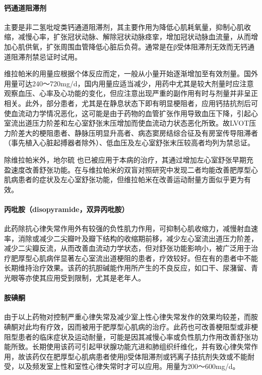 \paragraph{钙通道阻滞剂}

主要是非二氢吡啶类钙通道阻滞剂，其主要作用为降低心肌耗氧量，抑制心肌收缩，减慢心率，扩张冠状动脉、解除冠状动脉痉挛，增加冠状动脉血流量，从而增加心肌供氧，扩张周围血管降低心脏后负荷。通常是在β受体阻滞剂无效而无钙通道阻滞剂禁忌证时试用。

维拉帕米的用量应根据个体反应而定，一般从小量开始逐渐增加至有效剂量。国外用量可达240～720mg/d，国内用量应适当减少，用药中尤其是较大剂量时应注意观察血压、心率及心功能的变化，但应注意出现严重的副作用有时与剂量并非呈正相关。此外，部分患者，尤其是在静息状态下即有明显梗阻者，应用钙拮抗剂后可使血流动力学情况恶化，这可能是由于药物的血管扩张作用导致血压下降，引起心室流出道压力阶差和左心室舒张末压增加而使血流动力状态恶化所致。故LVOT压力阶差大的梗阻患者、静脉压明显升高者、病态窦房结综合征及有房室传导阻滞者（事先植入心脏起搏器者除外）、低血压及左心室舒张末压较高者均列为禁忌证。

除维拉帕米外，地尔硫{}
也已被应用于本病的治疗，其通过增加左心室舒张早期充盈速度改善舒张功能。在与维拉帕米的双盲对照研究中发现二者均能改善肥厚型心肌病患者的症状及左心室舒张功能，但维拉帕米在改善运动耐量方面似乎更为有效。

\paragraph{丙吡胺（disopyramide，双异丙吡胺）}

此药除抗心律失常作用外有较强的负性肌力作用，可抑制心肌收缩力，减慢射血速率，消除或减少二尖瓣叶及瓣下结构的收缩期前移，减少左心室流出道压力阶差，减少二尖瓣反流，从而改善血流动力学状态，但对舒张功能影响小，被广泛用于治疗肥厚型心肌病伴显著左心室流出道梗阻的患者，疗效较好。但在有的患者中不能长期维持治疗效果。该药的抗胆碱能作用所产生的不良反应，如口干、尿潴留、青光眼等亦使其应用受到限制，尤其是老年人。

\paragraph{胺碘酮}

由于以上药物对控制严重心律失常及减少室上性心律失常发作的效果均较差，而胺碘酮对此均有疗效，因而被用于肥厚型心肌病的治疗。此药也可改善梗阻型或非梗阻型患者的临床症状及运动耐量，可能是因其减慢心率或负性肌力作用改善舒张功能所致。长期使用该药可引起甲状腺功能亢进和肺组织纤维化，并有致心律失常作用，故该药仅在肥厚型心肌病患者使用β受体阻滞剂或钙离子拮抗剂失效或不能耐受，以及频发室上性和室性心律失常时才可以应用。用量为200～600mg/d。

